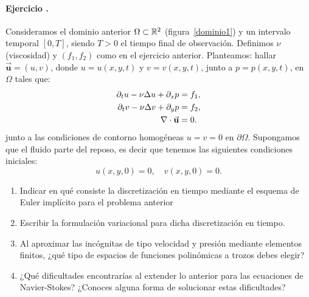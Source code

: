 \documentclass[11pt]{article}
\newcounter{actividad}
\newcommand{\actividad}[1]{
\stepcounter{actividad}
\paragraph*{Ejercicio \theactividad. #1}
}
\newcommand{\Vector}[1]{\ensuremath{\vec{\mathbf{#1}}}}
\renewcommand{\uu}{\Vector{u}}
\begin{document}
\actividad{} Consideramos el dominio anterior
$\Omega\subset {\mathbb R}^2$ (figura~\ref{dominio1}) y un intervalo temporal $[0,T]$, siendo $T>0$
el tiempo final de observación. Definimos $\nu$ (viscosidad) y $(f_1,f_2)$ como
en el ejercicio anterior.  Planteamos: hallar $\uu=(u,v)$, donde
$u=u(x,y,t)$ y $v=v(x,y,t)$, junto a $p=p(x,y,t)$,  en $\Omega$
tales que:
\begin{align*}
\dt u - \nu\Delta u + \dx p &= f_1,
\\
\dt v - \nu\Delta v + \dy p &= f_2,
\\
\div{\uu} & = 0.
\end{align*}
junto a las condiciones de contorno homogéneas $u=v=0$ en
$\partial\Omega$.  Supongamos que el fluido parte del reposo, es decir
que tenemos las siguientes condiciones iniciales:
$$
u(x,y,0) = 0, \quad v(x,y,0)=0.
$$
\begin{enumerate}
\item Indicar en qué consiste la discretización en tiempo mediante el
esquema de Euler implícito para el problema anterior
\item Escribir la formulación variacional para dicha discretización
en tiempo.
\item Al aproximar las incógnitas de tipo velocidad y presión mediante
  elementos finitos, ¿qué tipo de espacios de funciones polinómicas a
  trozos debes elegir?
\item ¿Qué dificultades encontrarías al extender lo anterior para las
  ecuaciones de Navier-Stokes? ¿Conoces alguna forma de solucionar
  estas dificultades?

\end{enumerate}
\end{document}

